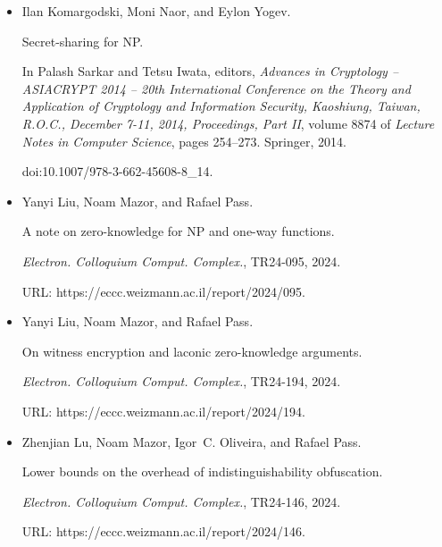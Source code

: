 \documentclass[10pt,a4paper]{article}
\begin{document}
\begin{itemize}
doi:10.1109/FOCS.2014.47.





\item[] 
[34]

Ilan Komargodski, Moni Naor, and Eylon Yogev.


Secret-sharing for NP.


In Palash Sarkar and Tetsu Iwata, editors, \emph{Advances in
Cryptology – ASIACRYPT 2014 – 20th International Conference on the Theory
and Application of Cryptology and Information Security, Kaoshiung, Taiwan,
R.O.C., December 7-11, 2014, Proceedings, Part II}, volume 8874 of \emph{Lecture Notes in Computer Science}, pages 254–273. Springer, 2014.


doi:10.1007/978-3-662-45608-8\_14.





\item[] 
[35]

Yanyi Liu, Noam Mazor, and Rafael Pass.


A note on zero-knowledge for NP and one-way functions.


\emph{Electron. Colloquium Comput. Complex.}, TR24-095, 2024.


URL: https://eccc.weizmann.ac.il/report/2024/095.





\item[] 
[36]

Yanyi Liu, Noam Mazor, and Rafael Pass.


On witness encryption and laconic zero-knowledge arguments.


\emph{Electron. Colloquium Comput. Complex.}, TR24-194, 2024.


URL: https://eccc.weizmann.ac.il/report/2024/194.





\item[] 
[37]

Zhenjian Lu, Noam Mazor, Igor C. Oliveira, and Rafael Pass.


Lower bounds on the overhead of indistinguishability obfuscation.


\emph{Electron. Colloquium Comput. Complex.}, TR24-146, 2024.


URL: https://eccc.weizmann.ac.il/report/2024/146.






\end{itemize}
\end{document}
